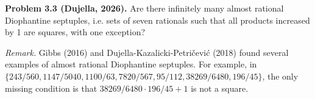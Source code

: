 \textbf{Problem 3.3 (Dujella, 2026).} Are there infinitely many almost rational Diophantine septuples, i.e. sets of seven rationals such that all products increased by 1 are squares, with one exception?

\medskip

\textit{Remark.} Gibbs (2016) and Dujella-Kazalicki-Petričević (2018) found several examples of almost rational Diophantine septuples. For example, in $\{243/560, 1147/5040, 1100/63, 7820/567, 95/112, 38269/6480, 196/45\}$, the only missing condition is that $38269/6480 \cdot 196/45+1$ is not a square.
